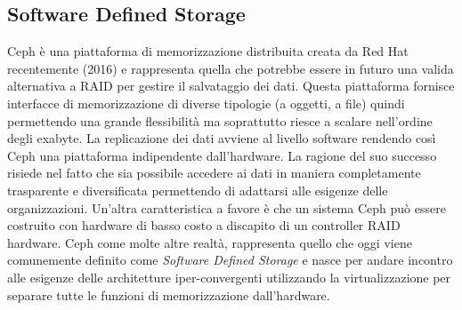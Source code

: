 \subsection{Software Defined Storage}
Ceph è una piattaforma di memorizzazione distribuita creata da Red Hat recentemente (2016) e rappresenta quella che potrebbe essere in futuro una valida alternativa a RAID per gestire il salvataggio dei dati. Questa piattaforma fornisce interfacce di memorizzazione di diverse tipologie (a oggetti, a file) quindi permettendo una grande flessibilità ma soprattutto riesce a scalare nell'ordine degli exabyte. La replicazione dei dati avviene al livello software rendendo così Ceph una piattaforma indipendente dall'hardware. La ragione del suo successo risiede nel fatto che sia possibile accedere ai dati in maniera completamente trasparente e diversificata permettendo di adattarsi alle esigenze delle organizzazioni. Un'altra caratteristica a favore è che un sistema Ceph può essere costruito con hardware di basso costo a discapito di un controller RAID hardware. Ceph come molte altre realtà, rappresenta quello che oggi viene comunemente definito come \textit{Software Defined Storage} e nasce per andare incontro alle esigenze delle architetture iper-convergenti utilizzando la virtualizzazione per separare tutte le funzioni di memorizzazione dall'hardware.
